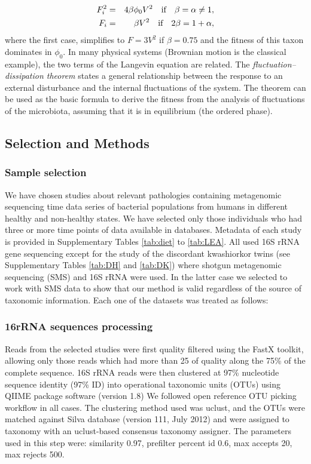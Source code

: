 \begin{eqnarray}
F_i^2 &=& 4 \beta \phi_0 V^2\quad \textrm{if} \quad  \beta = \alpha \neq 1, \notag \\
F_i &=& \beta V^2\quad \textrm{if} \quad  2\beta = 1+\alpha,
\notag
\end{eqnarray}
where the first case, simplifies to $F= 3 V^2$ if $\beta = 0.75$ and the fitness of this taxon dominates in $\phi_0$. 
In many physical systems (Brownian motion is the classical example), the two terms of the Langevin equation are related.  The \emph{fluctuation--dissipation theorem} states a general relationship between the response to an external disturbance and the internal fluctuations of the system\cite{FD}. The theorem can be used as the basic formula to derive the fitness from the analysis of fluctuations 
of the microbiota, assuming that it is in equilibrium (the ordered phase).  



\subsection*{Selection and Methods}

\subsubsection*{Sample selection}
We have chosen studies about relevant pathologies containing metagenomic sequencing time data series of bacterial populations from humans in different healthy and non-healthy states. We have selected only those individuals who had three or more time points of data available in databases. Metadata of each study is provided in Supplementary Tables \ref{tab:diet} to \ref{tab:LEA}. All used 16S rRNA gene sequencing except for the study of the discordant kwashiorkor twins\cite{kwashiorkor} (see Supplementary Tables \ref{tab:DH} and \ref{tab:DK}) where shotgun metagenomic sequencing (SMS) and 16S rRNA were used. In the latter case we selected to work with SMS data to show that our method is valid regardless of the source of taxonomic information. Each one of the datasets was treated as follows:

\subsubsection*{16rRNA sequences processing}
Reads from the selected studies were first quality filtered using the FastX toolkit\cite{FASTX}, allowing only those reads which had more than 25 of quality along the 75\% of the complete sequence. 16S rRNA reads were then clustered at 97\% nucleotide sequence identity (97\% ID) into operational taxonomic units (OTUs) using QIIME package software\cite{QIIME} (version 1.8) We followed open reference OTU picking workflow in all cases. The clustering method used was uclust, and the OTUs were matched against Silva database\cite{SILVA} (version 111, July 2012) and were assigned to taxonomy with an uclust-based consensus taxonomy assigner. The parameters used in this step were: similarity 0.97, prefilter percent id 0.6, max accepts 20, max rejects 500. 

